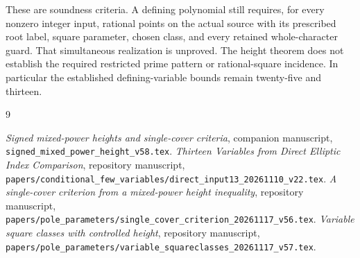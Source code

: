 \documentclass[11pt,a4paper]{article}
\begin{document}
These are soundness criteria. A defining polynomial still requires,
for every nonzero integer input, rational points on the actual source
with its prescribed root label, square parameter, chosen class, and
every retained whole-character guard. That simultaneous realization
is unproved. The height theorem does not establish the required
restricted prime pattern or rational-square incidence. In particular
the established defining-variable bounds remain twenty-five and
thirteen.

\begin{thebibliography}{9}\raggedright
{}\emph{Signed mixed-power heights and single-cover criteria},
companion manuscript, \nolinkurl{signed_mixed_power_height_v58.tex}.
\emph{Thirteen Variables from Direct Elliptic
Index Comparison}, repository manuscript,
\nolinkurl{papers/conditional_few_variables/direct_input13_20261110_v22.tex}.
\emph{A single-cover criterion from a mixed-power
height inequality}, repository manuscript,
\nolinkurl{papers/pole_parameters/single_cover_criterion_20261117_v56.tex}.
\emph{Variable square classes with controlled height},
repository manuscript,
\nolinkurl{papers/pole_parameters/variable_squareclasses_20261117_v57.tex}.
\end{thebibliography}
\end{document}

